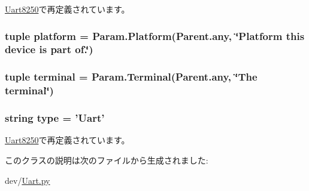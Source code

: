 \hyperlink{classUart_1_1Uart8250_a17da7064bc5c518791f0c891eff05fda}{Uart8250}で再定義されています。\hypertarget{classUart_1_1Uart_ae6d09ca44893db6cdb66d62deaa1aefd}{
\subsubsection[{platform}]{\setlength{\rightskip}{0pt plus 5cm}tuple {\bf platform} = Param.Platform(Parent.any, \char`\"{}Platform this device is part of.\char`\"{})}}
\label{classUart_1_1Uart_ae6d09ca44893db6cdb66d62deaa1aefd}
\hypertarget{classUart_1_1Uart_a36fbd7aa3e5bc702238c8fc439330d8f}{
\subsubsection[{terminal}]{\setlength{\rightskip}{0pt plus 5cm}tuple {\bf terminal} = Param.Terminal(Parent.any, \char`\"{}The {\bf terminal}\char`\"{})}}
\label{classUart_1_1Uart_a36fbd7aa3e5bc702238c8fc439330d8f}
\hypertarget{classUart_1_1Uart_acce15679d830831b0bbe8ebc2a60b2ca}{
\subsubsection[{type}]{\setlength{\rightskip}{0pt plus 5cm}string {\bf type} = '{\bf Uart}'}}
\label{classUart_1_1Uart_acce15679d830831b0bbe8ebc2a60b2ca}


\hyperlink{classUart_1_1Uart8250_acce15679d830831b0bbe8ebc2a60b2ca}{Uart8250}で再定義されています。

このクラスの説明は次のファイルから生成されました:\begin{DoxyCompactItemize}
\item 
dev/\hyperlink{Uart_8py}{Uart.py}\end{DoxyCompactItemize}
